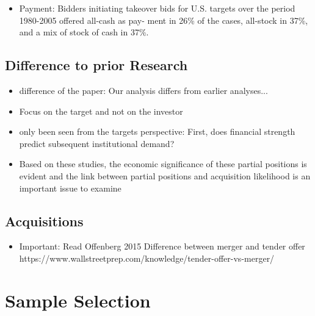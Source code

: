 \documentclass[12pt]{article}
\begin{document}
    \begin{itemize}
        
        \item Payment: Bidders initiating takeover bids for U.S. targets over the period 1980-2005 offered all-cash as pay- ment in 26\% of the cases, all-stock in 37\%, and a mix of stock of cash in 37\%. \citep{Mitchell2011}

    \end{itemize}

\subsection{Difference to prior Research}

    \begin{itemize}

        \item difference of the paper: Our analysis differs from earlier analyses...\citep{Brigida2012}

        \item Focus on the target and not on the investor 

        \item only been seen from the targets perspective: First, does financial strength predict subsequent institutional demand? \citep{Choi2012}

        \item Based on these studies, the economic significance of these partial positions is evident and the link between partial positions and acquisition likelihood is an important issue to examine \citep{Akhigbe2007}
    \end{itemize}

\subsection{Acquisitions}

\begin{itemize}
    \item Important: Read Offenberg 2015 Difference between merger and tender offer 
https://www.wallstreetprep.com/knowledge/tender-offer-vs-merger/
\end{itemize}

\section{Sample Selection}
\end{document}
